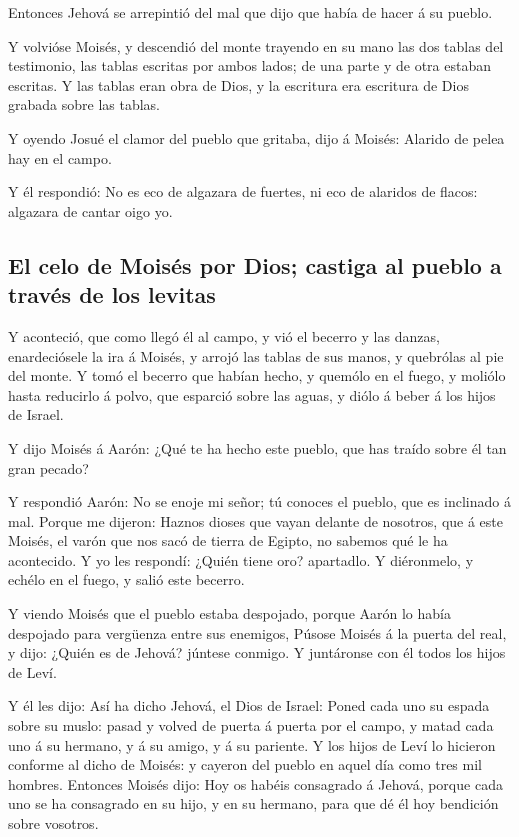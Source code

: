  Entonces Jehová se arrepintió del mal que dijo que había
de hacer á su pueblo.

 Y volvióse Moisés, y descendió del monte trayendo en su
mano las dos tablas del testimonio, las tablas escritas por ambos lados;
de una parte y de otra estaban escritas.  Y las tablas
eran obra de Dios, y la escritura era escritura de Dios grabada sobre
las tablas.

 Y oyendo Josué el clamor del pueblo que gritaba, dijo á
Moisés: Alarido de pelea hay en el campo.

 Y él respondió: No es eco de algazara de fuertes, ni eco
de alaridos de flacos: algazara de cantar oigo yo.

\hypertarget{el-celo-de-moisuxe9s-por-dios-castiga-al-pueblo-a-travuxe9s-de-los-levitas}{%
\subsection{El celo de Moisés por Dios; castiga al pueblo a través de
los
levitas}\label{el-celo-de-moisuxe9s-por-dios-castiga-al-pueblo-a-travuxe9s-de-los-levitas}}

 Y aconteció, que como llegó él al campo, y vió el
becerro y las danzas, enardeciósele la ira á Moisés, y arrojó las tablas
de sus manos, y quebrólas al pie del monte.  Y tomó el
becerro que habían hecho, y quemólo en el fuego, y moliólo hasta
reducirlo á polvo, que esparció sobre las aguas, y diólo á beber á los
hijos de Israel.

 Y dijo Moisés á Aarón: ¿Qué te ha hecho este pueblo, que
has traído sobre él tan gran pecado?

 Y respondió Aarón: No se enoje mi señor; tú conoces el
pueblo, que es inclinado á mal.  Porque me dijeron:
Haznos dioses que vayan delante de nosotros, que á este Moisés, el varón
que nos sacó de tierra de Egipto, no sabemos qué le ha acontecido.
 Y yo les respondí: ¿Quién tiene oro? apartadlo. Y
diéronmelo, y echélo en el fuego, y salió este becerro.

 Y viendo Moisés que el pueblo estaba despojado, porque
Aarón lo había despojado para vergüenza entre sus enemigos,
 Púsose Moisés á la puerta del real, y dijo: ¿Quién es de
Jehová? júntese conmigo. Y juntáronse con él todos los hijos de Leví.

 Y él les dijo: Así ha dicho Jehová, el Dios de Israel:
Poned cada uno su espada sobre su muslo: pasad y volved de puerta á
puerta por el campo, y matad cada uno á su hermano, y á su amigo, y á su
pariente.  Y los hijos de Leví lo hicieron conforme al
dicho de Moisés: y cayeron del pueblo en aquel día como tres mil
hombres.  Entonces Moisés dijo: Hoy os habéis consagrado
á Jehová, porque cada uno se ha consagrado en su hijo, y en su hermano,
para que dé él hoy bendición sobre vosotros.

